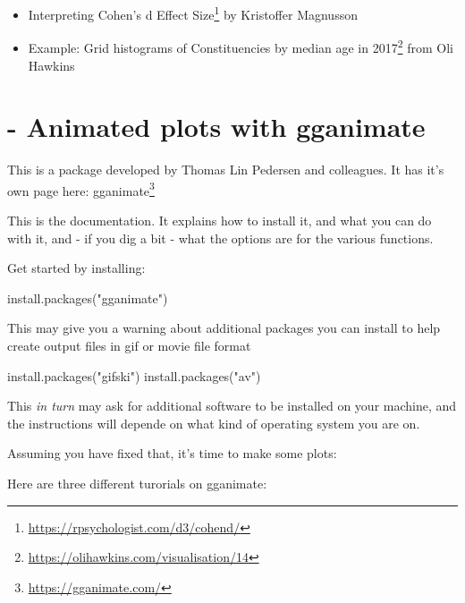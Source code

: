 \documentclass[
  12pt,
  a5paper,
]{book}
\newenvironment{Shaded}{\begin{snugshade}}{\end{snugshade}}
\newcommand{\FunctionTok}[1]{\textcolor[rgb]{0.00,0.00,0.00}{#1}}
\newcommand{\NormalTok}[1]{#1}
\newcommand{\StringTok}[1]{\textcolor[rgb]{0.31,0.60,0.02}{#1}}
\DeclareRobustCommand{\href}[2]{#2\footnote{\url{#1}}}
\providecommand{\tightlist}{%
  \setlength{\itemsep}{0pt}\setlength{\parskip}{0pt}}
\begin{document}
\begin{itemize}
\tightlist
\item
  \href{https://rpsychologist.com/d3/cohend/}{Interpreting Cohen's d Effect Size} by Kristoffer Magnusson
\item
  Example: Grid histograms of \href{https://olihawkins.com/visualisation/14}{Constituencies by median age in 2017} from Oli Hawkins
\end{itemize}

\hypertarget{animated-plots-with-gganimate}{%
\chapter*{- Animated plots with gganimate}\label{animated-plots-with-gganimate}}


This is a package developed by Thomas Lin Pedersen and colleagues. It has it's own page here:
\href{https://gganimate.com/}{gganimate}

This is the documentation. It explains how to install it, and what you can do with it, and - if you dig a bit - what the options are for the various functions.

Get started by installing:

\begin{Shaded}
\begin{Highlighting}[]
\FunctionTok{install.packages}\NormalTok{(}\StringTok{"gganimate"}\NormalTok{)}
\end{Highlighting}
\end{Shaded}

This may give you a warning about additional packages you can install to help create output files in gif or movie file format

\begin{Shaded}
\begin{Highlighting}[]
\FunctionTok{install.packages}\NormalTok{(}\StringTok{"gifski"}\NormalTok{)}
\FunctionTok{install.packages}\NormalTok{(}\StringTok{"av"}\NormalTok{)}
\end{Highlighting}
\end{Shaded}

This \emph{in turn} may ask for additional software to be installed on your machine, and the instructions will depende on what kind of operating system you are on.

Assuming you have fixed that, it's time to make some plots:

Here are three different turorials on gganimate:
\end{document}
